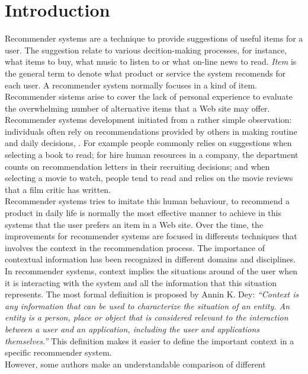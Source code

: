 \chapter{Introduction} \label{introduction} 

Recommender systems are a technique to provide suggestions of 
useful items for a user. The suggestion relate to various
decition-making processes, for instance, what items to buy, what music
to listen to or what on-line news to read. \textit{Item} is the general
term to denote what product or service  the system recomends for each
user. A recommender system normally focuses in a kind of item.
Recommender sistems arise to cover the lack of personal experience to
evaluate the overwhelming number of alternative items that a Web site
may offer\cite{resnick1997recommender}.
Recommender systems development initiated from a rather simple
observation: individuals often rely on recommendations provided by
others in making routine and daily decisions\cite{mahmood2009improving},
\cite{mcsherry2009differentially}. 
For example people commonly relies on suggestions when selecting a
book to read; for hire human resources in a company, the department
counts on recommendation letters in their recruiting decisions; and
when selecting a movie to watch, people tend to read and relies on the
movie reviews that a film critic has written.\\
Recommender systems tries to imitate this human behaviour, to
recommend a product in daily life is normally the most effective
manner to achieve in this systems that the user prefers an item in a
Web site. Over the time, the improvements for recommender systems are
focused in differents techniques that involves the context in the
recommendation process.  The importance of contextual information has
been recognized in different domains and disciplines. In recommender
systems, context implies the situations around of the user when it is
interacting with the system and all the information that this
situation represents.
The most formal definition is proposed by Annin K.
Dey\cite{dey2001understanding}: \textit{``Context is any information
that can be used to characterize the situation of an entity. An entity
is a person, place or object that is considered relevant to the
interaction between a user and an application, including the user and
applications themselves.''} This definition makes it easier to define
the important context in a specific recommender system.\\ 
However, some authors make an understandable comparison of different 
